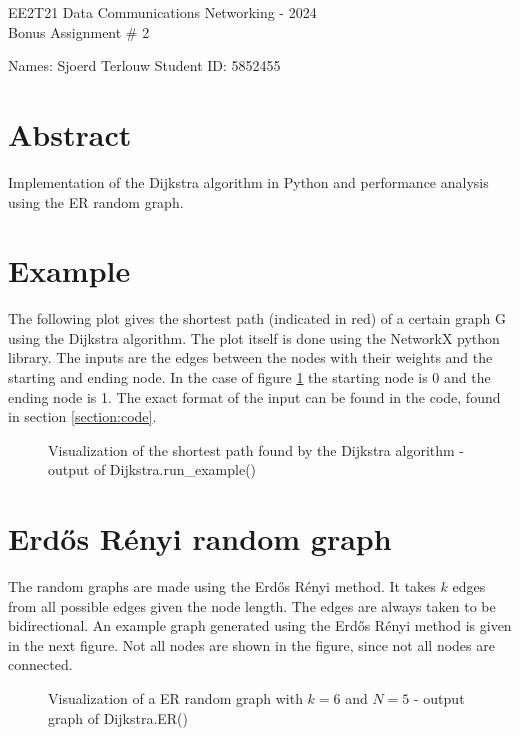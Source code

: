 \documentclass[11pt,fleqn]{article}
\begin{document}
	\begin{center}
		{\Large EE2T21 Data Communications Networking - 2024\\[0.1em]
			Bonus Assignment \# 2 \\}
	\end{center}

    \parbox[l][17mm][t]{\textwidth}{Names: Sjoerd Terlouw \hspace{6.66cm}
			Student ID: 5852455}
	\section{Abstract}
    Implementation of the Dijkstra algorithm in Python and performance analysis using the ER random graph.

    \section{Example}
    The following plot gives the shortest path (indicated in red) of a certain graph G using the Dijkstra algorithm. The plot itself is done using the NetworkX python library. 
    The inputs are the edges between the nodes with their weights and the starting and ending node. In the case of figure \ref{fig:example} the starting node is 0 and the ending node is 1.
    The exact format of the input can be found in the code, found in section \ref{section:code}.
    \begin{figure}[H]
        \centering
        
        \caption{Visualization of the shortest path found by the Dijkstra algorithm - output of Dijkstra.run\_example()}
        \label{fig:example}
    \end{figure}

    \section{Erdős Rényi random graph}
    The random graphs are made using the Erdős Rényi method. It takes $k$ edges from all possible edges given the node length.
    The edges are always taken to be bidirectional. An example graph generated using the Erdős Rényi method is given in the next figure. 
    Not all nodes are shown in the figure, since not all nodes are connected.
    \begin{figure}[H]
        \centering
        
        \caption{Visualization of a ER random graph with $k=6$ and $N=5$ - output graph of Dijkstra.ER()}
        \label{fig:ER_example}
    \end{figure}
\end{document}
